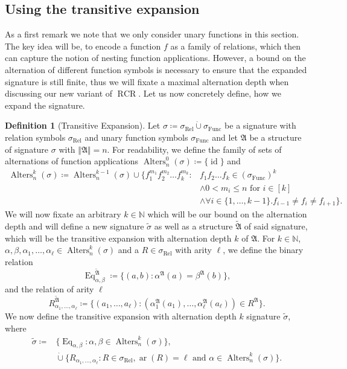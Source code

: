 \documentclass[a4paper,11pt,DIV=15]{scrartcl} %
\theoremstyle{plain}
\theoremstyle{definition}
\newtheorem{definition}[theorem]{Definition}
\newcommand{\RCR}{\operatorname{RCR}}
\begin{document}
\subsection{Using the transitive expansion} 

As a first remark we note that we only consider unary functions in this section.
The key idea will be, to encode a function $f$ as a family of relations, which then can capture the notion of nesting function applications.
However, a bound on the alternation of different function symbols is necessary to ensure that the expanded signature is still finite, thus we will fixate a maximal alternation depth when discussing our new variant of $\RCR$.
Let us now concretely define, how we expand the signature.

\begin{definition}[Transitive Expansion]
	Let $\sigma\coloneqq \sigma_{\operatorname{Rel}} \operatorname{\dot{\cup}} \sigma_{\operatorname{Func}}$ be a signature with relation symbols $\sigma_{\operatorname{Rel}}$ and unary function symbols $\sigma_{\operatorname{Func}}$ and let $\mathfrak A$ be a structure of signature $\sigma$ with $\Vert \mathfrak A \Vert=n$.
	For readability, we define the family of sets of alternations of function applications $\operatorname{Alters}_n^0(\sigma)\coloneqq\{\operatorname{id}\}$ and
	\begin{align*}
		\operatorname{Alters}^k_{n}(\sigma)\coloneqq \operatorname{Alters}^{k-1}_{n}(\sigma)\cup\{f_1^{m_1}f_2^{m_2}\dots f_k^{m_k} : & f_1f_2\dots f_k\in (\sigma_{\operatorname{Func}})^k \\ 
		& \land 0 < m_i \leq n \text{ for } i \in [k] \\ 
		& \land \forall i\in\{1,\dots,k-1\} . f_{i-1}\neq f_i \neq f_{i+1}\}.
	\end{align*}
	We will now fixate an arbitrary $k\in\mathbb N$ which will be our bound on the alternation depth and will define a new signature $\widetilde{\sigma}$ as well as a structure $\widetilde{\mathfrak A}$ of said signature, which will be the transitive expansion with alternation depth $k$ of $\mathfrak{A}$.
	For $k\in\mathbb N$, $\alpha,\beta,\alpha_1,\dots,\alpha_\ell\in \operatorname{Alters}^k_n(\sigma)$ and a $R\in \sigma_{\operatorname{Rel}}$ with arity $\ell$, we define the binary relation
	$$\operatorname{Eq}_{\alpha,\beta}^{\widetilde{\mathfrak A}}\coloneqq \{(a,b) : \alpha^{\mathfrak A}(a)=\beta^{\mathfrak A}(b)\},$$
	and the relation of arity $\ell$
	$$R_{\alpha_1,\dots,\alpha_\ell}^{\widetilde{\mathfrak A}} \coloneqq \{(a_1,\dots,a_\ell) : (\alpha_1^{\mathfrak A}(a_1),\dots,\alpha_\ell^{\mathfrak A}(a_\ell))\in R^{\mathfrak A}\}.$$
	We now define the transitive expansion with alternation depth $k$ signature $\widetilde{\sigma}$, where 
	\begin{align*}
		\widetilde{\sigma}\coloneqq & \{\operatorname{Eq}_{\alpha,\beta}: \alpha,\beta\in\operatorname{Alters}^k_n(\sigma)\}, \\
		& \operatorname{\dot{\cup}} \{R_{\alpha_1,\dots,\alpha_\ell} : R\in \sigma_{\operatorname{Rel}},\operatorname{ar}(R)=\ell \text{ and } \alpha\in \operatorname{Alters}^k_n(\sigma)\}.
	\end{align*}
\end{definition}
\end{document}
